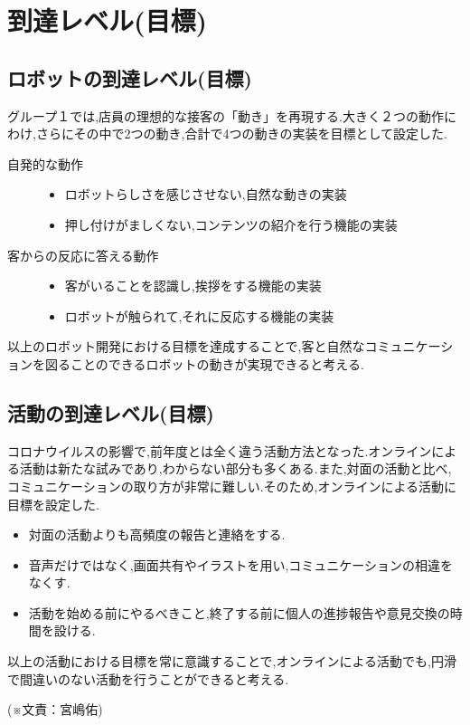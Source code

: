 \section{到達レベル(目標)}
\subsection{ロボットの到達レベル(目標)}
グループ１では,店員の理想的な接客の「動き」を再現する.大きく２つの動作にわけ,さらにその中で2つの動き,合計で4つの動きの実装を目標として設定した.
\begin{description}
   \item[自発的な動作]\mbox{}
      \begin{itemize}
 \item  ロボットらしさを感じさせない,自然な動きの実装
 \item 押し付けがましくない,コンテンツの紹介を行う機能の実装\\
      \end{itemize}
   \item[客からの反応に答える動作]\mbox{}
      \begin{itemize}
      \item 客がいることを認識し,挨拶をする機能の実装
      \item ロボットが触られて,それに反応する機能の実装
         \end{itemize}
\end{description}
以上のロボット開発における目標を達成することで,客と自然なコミュニケーションを図ることのできるロボットの動きが実現できると考える.
\subsection{活動の到達レベル(目標)}
コロナウイルスの影響で,前年度とは全く違う活動方法となった.オンラインによる活動は新たな試みであり,わからない部分も多くある.また,対面の活動と比べ,コミュニケーションの取り方が非常に難しい.そのため,オンラインによる活動に目標を設定した.
\begin{itemize}
    \item 対面の活動よりも高頻度の報告と連絡をする.
    \item 音声だけではなく,画面共有やイラストを用い,コミュニケーションの相違をなくす.
    \item 活動を始める前にやるべきこと,終了する前に個人の進捗報告や意見交換の時間を設ける.
\end{itemize}
以上の活動における目標を常に意識することで,オンラインによる活動でも,円滑で間違いのない活動を行うことができると考える.
\begin{flushright}
(※文責：宮嶋佑)
\end{flushright}

